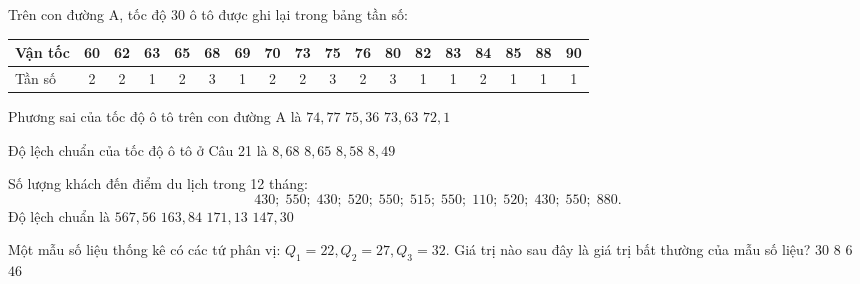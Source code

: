 \begin{ex}
	Trên con đường A, tốc độ 30 ô tô được ghi lại trong bảng tần số:
	\begin{center}
	\begin{tabular}{|l|c|c|c|c|c|c|c|c|c|c|c|c|c|c|c|c|c|}
		\hline
		Vận tốc & 60 & 62 & 63 & 65 & 68 & 69 & 70 & 73 & 75 & 76 & 80 & 82 & 83 & 84 & 85 & 88 & 90 \\
		\hline
		Tần số & 2 & 2 & 1 & 2 & 3 & 1 & 2 & 2 & 3 & 2 & 3 & 1 & 1 & 2 & 1 & 1 & 1 \\
		\hline
	\end{tabular}
	\end{center}
	Phương sai của tốc độ ô tô trên con đường A là
	\choice
	{\True $74{,}77$}
	{$75{,}36$}
	{$73{,}63$}
	{$72{,}1$}
\end{ex}

\begin{ex}
	Độ lệch chuẩn của tốc độ ô tô ở Câu 21 là
	\choice
	{$8{,}68$}
	{\True $8{,}65$}
	{$8{,}58$}
	{$8{,}49$}
\end{ex}

\begin{ex}
	Số lượng khách đến điểm du lịch trong 12 tháng:
	\[430;\; 550;\; 430;\; 520;\; 550;\; 515;\; 550;\; 110;\; 520;\; 430;\; 550;\; 880.\]
	Độ lệch chuẩn là
	\choice
	{$567{,}56$}
	{$163{,}84$}
	{\True $171{,}13$}
	{$147{,}30$}
\end{ex}

\begin{ex}
	Một mẫu số liệu thống kê có các tứ phân vị: $Q_1 = 22, Q_2 = 27, Q_3 = 32$. Giá trị nào sau đây là giá trị bất thường của mẫu số liệu?
	\choice
	{$30$}
	{$8$}
	{\True $6$}
	{$46$}
\end{ex}

